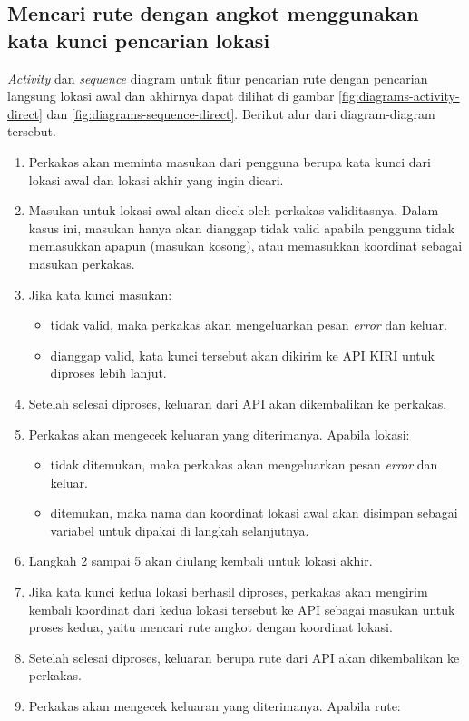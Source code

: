 \subsection{Mencari rute dengan angkot menggunakan kata kunci pencarian lokasi}
\label{sec:design-flow-direct}

\textit{Activity} dan \textit{sequence} diagram untuk fitur pencarian rute dengan pencarian langsung lokasi awal dan akhirnya dapat dilihat di gambar \ref{fig:diagrams-activity-direct} dan \ref{fig:diagrams-sequence-direct}. Berikut alur dari diagram-diagram tersebut.

\begin{enumerate}
	\item Perkakas akan meminta masukan dari pengguna berupa kata kunci dari lokasi awal dan lokasi akhir yang ingin dicari.
	\item Masukan untuk lokasi awal akan dicek oleh perkakas validitasnya. Dalam kasus ini, masukan hanya akan dianggap tidak valid apabila pengguna tidak memasukkan apapun (masukan kosong), atau memasukkan koordinat \latlon sebagai masukan perkakas.
	\item Jika kata kunci masukan:
	
	\begin{itemize}
		\item tidak valid, maka perkakas akan mengeluarkan pesan \textit{error} dan keluar.
		\item dianggap valid, kata kunci tersebut akan dikirim ke API KIRI untuk diproses lebih lanjut.
	\end{itemize}
	 
	\item Setelah selesai diproses, keluaran dari API akan dikembalikan ke perkakas.
	\item Perkakas akan mengecek keluaran yang diterimanya. Apabila lokasi:
	
	\begin{itemize}
		\item tidak ditemukan, maka perkakas akan mengeluarkan pesan \textit{error} dan keluar.
		\item ditemukan, maka nama dan koordinat \latlon lokasi awal akan disimpan sebagai variabel untuk dipakai di langkah selanjutnya.
	\end{itemize}
	
	\item Langkah 2 sampai 5 akan diulang kembali untuk lokasi akhir.
	\item Jika kata kunci kedua lokasi berhasil diproses, perkakas akan mengirim kembali koordinat \latlon dari kedua lokasi tersebut ke API sebagai masukan untuk proses kedua, yaitu mencari rute angkot dengan koordinat \latlon lokasi.
	\item Setelah selesai diproses, keluaran berupa rute dari API akan dikembalikan ke perkakas.
	\item Perkakas akan mengecek keluaran yang diterimanya. Apabila rute:
	

\end{enumerate}
